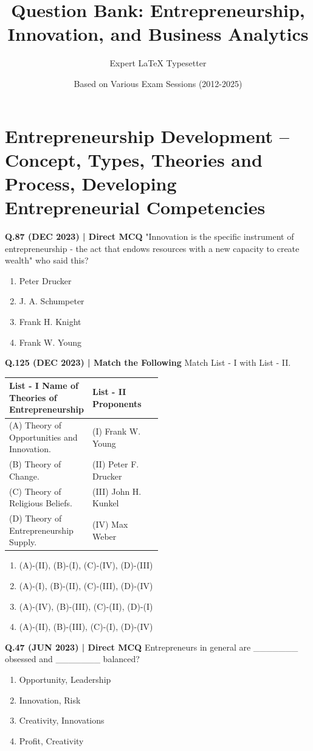 \documentclass{article}
\title{Question Bank: Entrepreneurship, Innovation, and Business Analytics}
\author{Expert LaTeX Typesetter}
\date{Based on Various Exam Sessions (2012-2025)}
\begin{document}
\maketitle
\tableofcontents
\newpage

\section{Entrepreneurship Development – Concept, Types, Theories and Process, Developing Entrepreneurial Competencies}

\textbf{Q.87 (DEC 2023) | Direct MCQ}
"Innovation is the specific instrument of entrepreneurship - the act that endows resources with a new capacity to create wealth" who said this?
\begin{enumerate}[label=(\arabic*)]
    \item Peter Drucker
    \item J. A. Schumpeter
    \item Frank H. Knight
    \item Frank W. Young
\end{enumerate}

\textbf{Q.125 (DEC 2023) | Match the Following}
Match List - I with List - II.
\begin{tabularx}{\linewidth}{@{} p{0.5\linewidth} X @{}}
    \toprule
    \textbf{List - I Name of Theories of Entrepreneurship} & \textbf{List - II Proponents} \\
    \midrule
    (A) Theory of Opportunities and Innovation. & (I) Frank W. Young \\
    (B) Theory of Change. & (II) Peter F. Drucker \\
    (C) Theory of Religious Beliefs. & (III) John H. Kunkel \\
    (D) Theory of Entrepreneurship Supply. & (IV) Max Weber \\
    \bottomrule
\end{tabularx}
\begin{enumerate}[label=(\arabic*)]
    \item (A)-(II), (B)-(I), (C)-(IV), (D)-(III)
    \item (A)-(I), (B)-(II), (C)-(III), (D)-(IV)
    \item (A)-(IV), (B)-(III), (C)-(II), (D)-(I)
    \item (A)-(II), (B)-(III), (C)-(I), (D)-(IV)
\end{enumerate}

\textbf{Q.47 (JUN 2023) | Direct MCQ}
Entrepreneurs in general are _______ obsessed and _______ balanced?
\begin{enumerate}[label=(\arabic*)]
    \item Opportunity, Leadership
    \item Innovation, Risk
    \item Creativity, Innovations
    \item Profit, Creativity
\end{enumerate}
\end{document}
